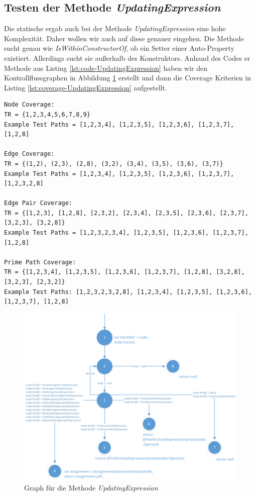 \subsection{Testen der Methode \textit{UpdatingExpression}}
Die statische ergab auch bei der Methode \textit{UpdatingExpression} eine hohe Komplexität. Daher wollen wir auch auf diese genauer eingehen. Die Methode sucht genau wie \textit{IsWithinConstructorOf}, ob ein Setter einer Auto-Property existiert. Allerdings sucht sie außerhalb des Konstruktors. Anhand des Codes er Methode aus Listing \ref{lst:code-UpdatingExpression} haben wir den Kontrollflussgraphen in Abbildung \ref{fig:graph-UpdatingExpression} erstellt und dann die Coverage Kriterien in Listing \ref{lst:coverage-UpdatingExpression} aufgestellt.
\begin{lstlisting}[caption={Coverage für die Mehtode \textit{UpdatingExpression}},
label=lst:coverage-UpdatingExpression]
Node Coverage:
TR = {1,2,3,4,5,6,7,8,9}
Example Test Paths = [1,2,3,4], [1,2,3,5], [1,2,3,6], [1,2,3,7], [1,2,8]

Edge Coverage:
TR = {(1,2), (2,3), (2,8), (3,2), (3,4), (3,5), (3,6), (3,7)}
Example Test Paths = [1,2,3,4], [1,2,3,5], [1,2,3,6], [1,2,3,7], [1,2,3,2,8]

Edge Pair Coverage:
TR = {[1,2,3], [1,2,8], [2,3,2], [2,3,4], [2,3,5], [2,3,6], [2,3,7], [3,2,3], [3,2,8]}
Example Test Paths = [1,2,3,2,3,4], [1,2,3,5], [1,2,3,6], [1,2,3,7], [1,2,8]

Prime Path Coverage:
TR = {[1,2,3,4], [1,2,3,5], [1,2,3,6], [1,2,3,7], [1,2,8], [3,2,8], [3,2,3], [2,3,2]}
Example Test Paths: [1,2,3,2,3,2,8], [1,2,3,4], [1,2,3,5], [1,2,3,6], [1,2,3,7], [1,2,8]
\end{lstlisting}
\begin{figure}[h]
	\centering
	\includegraphics[width=\textwidth]{images/GraphUpdatingExpression.png}
	\caption{Graph für die Methode \textit{UpdatingExpression}}
	\label{fig:graph-UpdatingExpression}
\end{figure}
